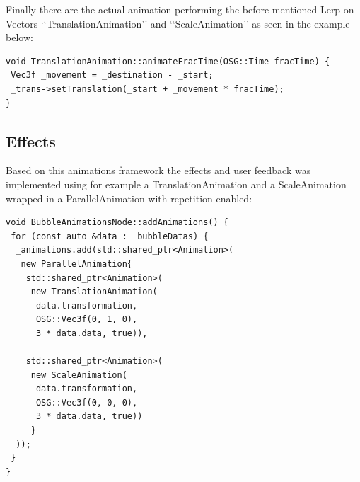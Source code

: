 Finally there are the actual animation performing the before mentioned Lerp on Vectors \lq\lq{}TranslationAnimation\rq\rq{} and \lq\lq{}ScaleAnimation\rq\rq{} as seen in the example below:
\begin{lstlisting}[breaklines=true, caption={TranslattionAnimation::animate}]
void TranslationAnimation::animateFracTime(OSG::Time fracTime) {
 Vec3f _movement = _destination - _start;
 _trans->setTranslation(_start + _movement * fracTime);
}
\end{lstlisting}

\subsection{Effects}
Based on this animations framework the effects and user feedback was implemented using for example a TranslationAnimation and a ScaleAnimation wrapped in a ParallelAnimation with repetition enabled:
\begin{lstlisting}[breaklines=true, caption={BubbleAnimationsNode::animate}]
void BubbleAnimationsNode::addAnimations() {
 for (const auto &data : _bubbleDatas) {
  _animations.add(std::shared_ptr<Animation>(
   new ParallelAnimation{
    std::shared_ptr<Animation>(
     new TranslationAnimation(
      data.transformation,
      OSG::Vec3f(0, 1, 0),
      3 * data.data, true)),

    std::shared_ptr<Animation>(
     new ScaleAnimation(
      data.transformation,
      OSG::Vec3f(0, 0, 0),
      3 * data.data, true))
     }
  ));
 }
}
\end{lstlisting}
